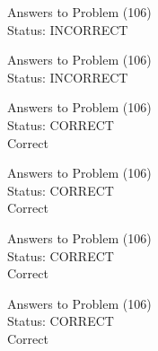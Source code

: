 \documentclass[11pt]{article}
\begin{document}
\begin{minipage}[t]{0.5\textwidth}
  {\centering
  
  Answers to Problem (106)\\
  Status: INCORRECT\\
  
  }
\end{minipage}
\begin{minipage}[t]{0.5\textwidth}
  {\centering
  
  Answers to Problem (106)\\
  Status: INCORRECT\\
  
  }
\end{minipage}
\begin{minipage}[t]{0.5\textwidth}
  {\centering
  
  Answers to Problem (106)\\
  Status: CORRECT\\
  Correct\\
  }
\end{minipage}
\begin{minipage}[t]{0.5\textwidth}
  {\centering
  
  Answers to Problem (106)\\
  Status: CORRECT\\
  Correct\\
  }
\end{minipage}
\begin{minipage}[t]{0.5\textwidth}
  {\centering
  
  Answers to Problem (106)\\
  Status: CORRECT\\
  Correct\\
  }
\end{minipage}
\begin{minipage}[t]{0.5\textwidth}
  {\centering
  
  Answers to Problem (106)\\
  Status: CORRECT\\
  Correct\\
  }
\end{minipage}
\end{document}
